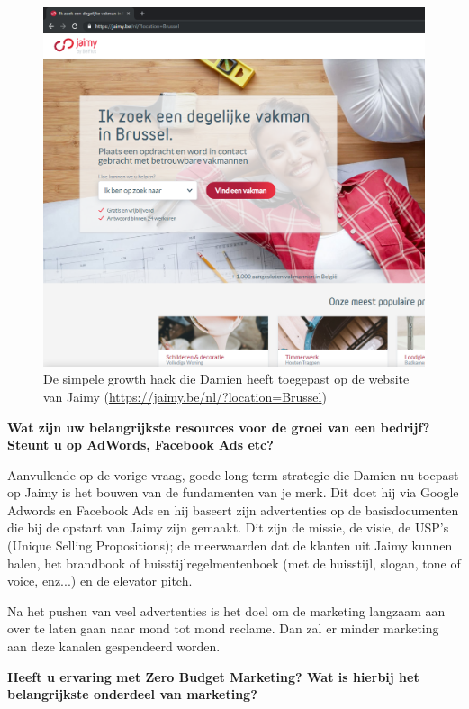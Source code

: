 \begin{figure}[h!]
	\includegraphics[width=\linewidth]{img/location-growth-hack.png}
	\caption{De simpele growth hack die Damien heeft toegepast op de website van Jaimy (\href{https://jaimy.be/nl/?location=Brussel}{https://jaimy.be/nl/?location=Brussel})}
	\label{fig:growth-hack-damien}
\end{figure}
	
\textbf{Wat zijn uw belangrijkste resources voor de groei van een bedrijf? Steunt u op AdWords, Facebook Ads etc?}
	
Aanvullende op de vorige vraag, goede long-term strategie die Damien nu toepast op Jaimy is het bouwen van de fundamenten van je merk. Dit doet hij via Google Adwords en Facebook Ads en hij baseert zijn advertenties op de basisdocumenten die bij de opstart van Jaimy zijn gemaakt. Dit zijn de missie, de visie, de USP's (Unique Selling Propositions); de meerwaarden dat de klanten uit Jaimy kunnen halen, het brandbook of huisstijlregelmentenboek (met de huisstijl, slogan, tone of voice, enz...) en de elevator pitch. 

Na het pushen van veel advertenties is het doel om de marketing langzaam aan over te laten gaan naar mond tot mond reclame. Dan zal er minder marketing aan deze kanalen gespendeerd worden. 

\textbf{Heeft u ervaring met Zero Budget Marketing? Wat is hierbij het belangrijkste onderdeel van marketing?}
	
